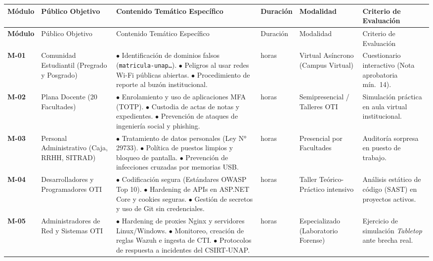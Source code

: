 \begin{center}
\scriptsize
\setlength{\tabcolsep}{3pt}
\renewcommand{\arraystretch}{1.2}
\begin{longtable}{>{\bfseries}p{1.1cm} p{2.5cm} p{4.3cm} >{\centering\arraybackslash}p{1.3cm} p{2.1cm} p{2.6cm}}
\toprule
\rowcolor{outermarginbgcolor}
Módulo & Público Objetivo & Contenido Temático Específico & Duración & Modalidad & Criterio de Evaluación \\
\midrule
\endfirsthead
\toprule
\rowcolor{outermarginbgcolor}
Módulo & Público Objetivo & Contenido Temático Específico & Duración & Modalidad & Criterio de Evaluación \\
\midrule
\endhead
\bottomrule
\endfoot
M-01 & Comunidad Estudiantil (Pregrado y Posgrado) & $\bullet$ Identificación de dominios falsos (\texttt{matricula-unap\dots}). \newline $\bullet$ Peligros al usar redes Wi-Fi públicas abiertas. \newline $\bullet$ Procedimiento de reporte al buzón institucional. & 2 horas & Virtual Asíncrono (Campus Virtual) & Cuestionario interactivo (Nota aprobatoria mín.\ 14). \\
\midrule
M-02 & Plana Docente (20 Facultades) & $\bullet$ Enrolamiento y uso de aplicaciones MFA (TOTP). \newline $\bullet$ Custodia de actas de notas y expedientes. \newline $\bullet$ Prevención de ataques de ingeniería social y phishing. & 4 horas & Semipresencial / Talleres OTI & Simulación práctica en aula virtual institucional. \\
\midrule
M-03 & Personal Administrativo (Caja, RRHH, SITRAD) & $\bullet$ Tratamiento de datos personales (Ley N° 29733). \newline $\bullet$ Política de puestos limpios y bloqueo de pantalla. \newline $\bullet$ Prevención de infecciones cruzadas por memorias USB. & 4 horas & Presencial por Facultades & Auditoría sorpresa en puesto de trabajo. \\
\midrule
M-04 & Desarrolladores y Programadores OTI & $\bullet$ Codificación segura (Estándares OWASP Top 10). \newline $\bullet$ Hardening de APIs en ASP.NET Core y cookies seguras. \newline $\bullet$ Gestión de secretos y uso de Git sin credenciales. & 16 horas & Taller Teórico-Práctico intensivo & Análisis estático de código (SAST) en proyectos activos. \\
\midrule
M-05 & Administradores de Red y Sistemas OTI & $\bullet$ Hardening de proxies Nginx y servidores Linux/Windows. \newline $\bullet$ Monitoreo, creación de reglas Wazuh e ingesta de CTI. \newline $\bullet$ Protocolos de respuesta a incidentes del CSIRT-UNAP. & 20 horas & Especializado (Laboratorio Forense) & Ejercicio de simulación \textit{Tabletop} ante brecha real. \\
\bottomrule
\end{longtable}
\end{center}